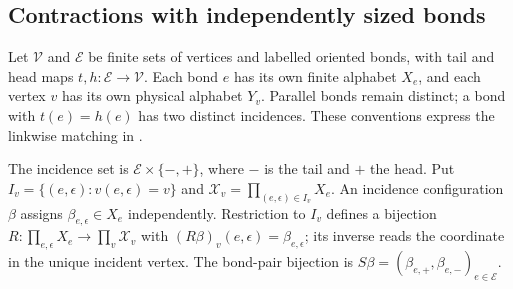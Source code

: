\subsection{Contractions with independently sized bonds}
\label{sec:peps_dependent_networks}

Let $\mathcal V$ and $\mathcal E$ be finite sets of vertices and labelled
oriented bonds, with tail and head maps $t,h:\mathcal E\to\mathcal V$.
Each bond $e$ has its own finite alphabet $X_e$, and each vertex $v$ has its
own physical alphabet $Y_v$. Parallel bonds remain distinct; a bond with
$t(e)=h(e)$ has two distinct incidences. These conventions express the
linkwise matching in \cite[Definition~5.1]{Schuch2010PEPS}.

\begin{definition}%
    \label{def:peps_dependent_incidence}
    \leanok
    The incidence set is $\mathcal E\times\{-,+\}$, where $-$ is the tail
    and $+$ the head. Put $I_v=\{(e,\epsilon):v(e,\epsilon)=v\}$ and
    $\mathcal X_v=\prod_{(e,\epsilon)\in I_v}X_e$.
    An incidence configuration $\beta$ assigns $\beta_{e,\epsilon}\in X_e$
    independently. Restriction to $I_v$ defines a bijection
    $R:\prod_{e,\epsilon}X_e\to\prod_v\mathcal X_v$ with
    $(R\beta)_v(e,\epsilon)=\beta_{e,\epsilon}$; its inverse reads the
    coordinate in the unique incident vertex. The bond-pair bijection is
    $S\beta=(\beta_{e,+},\beta_{e,-})_{e\in\mathcal E}$.
\end{definition}

